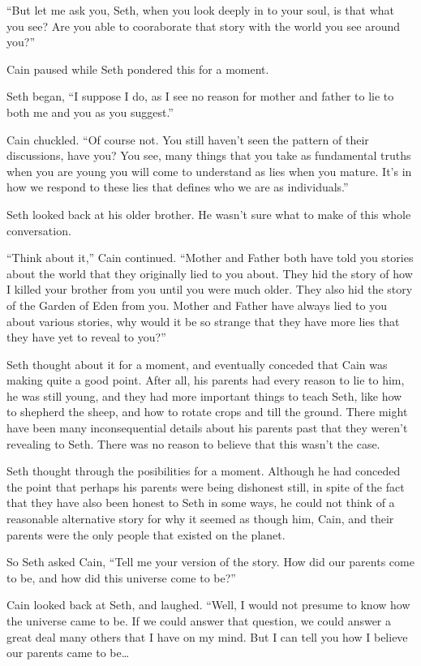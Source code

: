 \documentclass[12pt,twoside,titlepage]{report}
\begin{document}
``But let me ask you, Seth, when you look deeply in to your soul, is
that what you see? Are you able to cooraborate that story with the world
you see around you?''

Cain paused while Seth pondered this for a moment.

Seth began, ``I suppose I do, as I see no reason for mother and father
to lie to both me and you as you suggest.''

Cain chuckled. ``Of course not. You still haven't seen the pattern of
their discussions, have you? You see, many things that you take as
fundamental truths when you are young you will come to understand as
lies when you mature. It's in how we respond to these lies that defines
who we are as individuals.''

Seth looked back at his older brother. He wasn't sure what to make of
this whole conversation.

``Think about it,'' Cain continued. ``Mother and Father both have told
you stories about the world that they originally lied to you about. They
hid the story of how I killed your brother from you until you were much
older. They also hid the story of the Garden of Eden from you. Mother
and Father have always lied to you about various stories, why would it
be so strange that they have more lies that they have yet to reveal to
you?''

Seth thought about it for a moment, and eventually conceded that Cain
was making quite a good point. After all, his parents had every reason
to lie to him, he was still young, and they had more important things to
teach Seth, like how to shepherd the sheep, and how to rotate crops and
till the ground. There might have been many inconsequential details
about his parents past that they weren't revealing to Seth. There was no
reason to believe that this wasn't the case.

Seth thought through the posibilities for a moment. Although he had
conceded the point that perhaps his parents were being dishonest still,
in spite of the fact that they have also been honest to Seth in some
ways, he could not think of a reasonable alternative story for why it
seemed as though him, Cain, and their parents were the only people that
existed on the planet.

So Seth asked Cain, ``Tell me your version of the story. How did our
parents come to be, and how did this universe come to be?''

Cain looked back at Seth, and laughed. ``Well, I would not presume to
know how the universe came to be. If we could answer that question, we
could answer a great deal many others that I have on my mind. But I can
tell you how I believe our parents came to be\ldots{}
\end{document}
